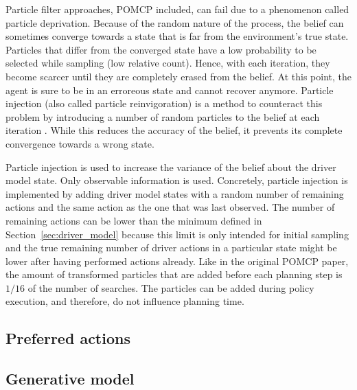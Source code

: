 Particle filter approaches, POMCP included, can fail due to a phenomenon called particle deprivation. Because of the random nature of the process, the belief can sometimes converge towards a state that is far from the environment's true state. Particles that differ from the converged state have a low probability to be selected while sampling (low relative count). Hence, with each iteration, they become scarcer until they are completely erased from the belief. At this point, the agent is sure to be in an erroreous state and cannot recover anymore. Particle injection (also called particle reinvigoration) is a method to counteract this problem by introducing a number of random particles to the belief at each iteration \parencite{decision_making_book}. While this reduces the accuracy of the belief, it prevents its complete convergence towards a wrong state. 

Particle injection is used to increase the variance of the belief about the driver model state. Only observable information is used. Concretely, particle injection is implemented by adding driver model states with a random number of remaining actions and the same action as the one that was last observed. The number of remaining actions can be lower than the minimum defined in Section~\ref{sec:driver_model} because this limit is only intended for initial sampling and the true remaining number of driver actions in a particular state might be lower after having performed actions already. Like in the original POMCP paper, the amount of transformed particles that are added before each planning step is $1/16$ of the number of searches. The particles can be added during policy execution, and therefore, do not influence planning time.



\subsection{Preferred actions}
\label{sec:preferred_actions}




\subsection{Generative model}
\label{sec:gen_model}

